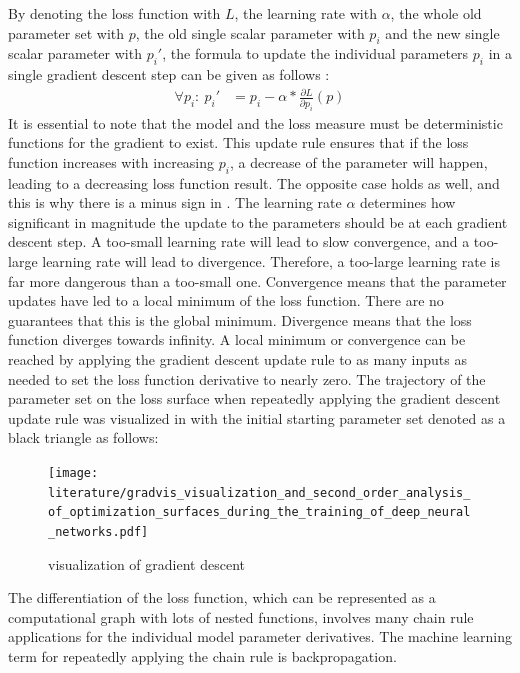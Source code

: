\documentclass[draft,final]{vutinfth} %
\begin{document}
    By denoting the loss function with $L$, the learning rate with $\alpha$, the whole old parameter set with $p$, the old single scalar parameter with $p_i$ and the new single scalar parameter with $p_i'$, the formula to update the individual parameters $p_i$ in a single gradient descent step can be given as follows \cite{GradientDescent}:
    \begin{align}
        \label{gradient_descent_update}
        \forall p_i:~p_i' &= p_i - \alpha * \frac{\partial{L}}{\partial{p_i}}(p)
    \end{align}
    It is essential to note that the model and the loss measure must be deterministic functions for the gradient to exist.
    This update rule ensures that if the loss function increases with increasing $p_i$, a decrease of the parameter will happen, leading to a decreasing loss function result.
    The opposite case holds as well, and this is why there is a minus sign in .
    The learning rate $\alpha$ determines how significant in magnitude the update to the parameters should be at each gradient descent step.
    A too-small learning rate will lead to slow convergence, and a too-large learning rate will lead to divergence.
    Therefore, a too-large learning rate is far more dangerous than a too-small one.
    Convergence means that the parameter updates have led to a local minimum of the loss function.
    There are no guarantees that this is the global minimum. Divergence means that the loss function diverges towards infinity.
    A local minimum or convergence can be reached by applying the gradient descent update rule to as many inputs as needed to set the loss function derivative to nearly zero.
    The trajectory of the parameter set on the loss surface when repeatedly applying the gradient descent update rule was visualized in \cite[p. 2]{gradient_descent_vis} with the initial starting parameter set denoted as a black triangle as follows:
    \begin{figure}[H]
        \centering{}
        \texttt{[image: literature/gradvis\_visualization\_and\_second\_order\_analysis\_of\_optimization\_surfaces\_during\_the\_training\_of\_deep\_neural\_networks.pdf]}
        \caption{visualization of gradient descent}
        \label{fig:gradient_descent_vis}
    \end{figure}
    The differentiation of the loss function, which can be represented as a computational graph with lots of nested functions, involves many chain rule applications for the individual model parameter derivatives. The machine learning term for repeatedly applying the chain rule is backpropagation.
\end{document}
